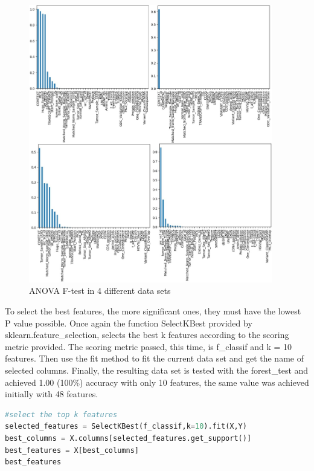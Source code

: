 \begin{figure}[h]
    \centering
    \includegraphics[width=0.95\textwidth,height=0.55\textheight]{Chapters/Figures/anova_test.jpg}
    \caption{ANOVA F-test in 4 different data sets}
    \label{fig:lda_graph}
\end{figure}

To select the best features, the more significant ones, they must have the lowest P value possible. Once again the function SelectKBest provided by sklearn.feature\_selection, selects the best k features according to the scoring metric provided. The scoring metric passed, this time, is f\_classif and k = 10 features. Then use the fit method to fit the current data set and get the name of selected columns. Finally, the resulting data set is tested with the forest\_test and achieved 1.00 (100\%) accuracy with only 10 features, the same value was achieved initially with 48 features.


\begin{lstlisting}[language=Python]
#select the top k features
selected_features = SelectKBest(f_classif,k=10).fit(X,Y)
best_columns = X.columns[selected_features.get_support()]
best_features = X[best_columns]
best_features
\end{lstlisting}



